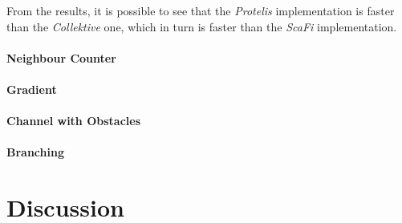 From the results, it is possible to see that the \emph{Protelis} implementation is faster than the \emph{Collektive} one,
which in turn is faster than the \emph{ScaFi} implementation.

\paragraph{Neighbour Counter}

\paragraph{Gradient}

\paragraph{Channel with Obstacles}

\paragraph{Branching}

\section{Discussion}

